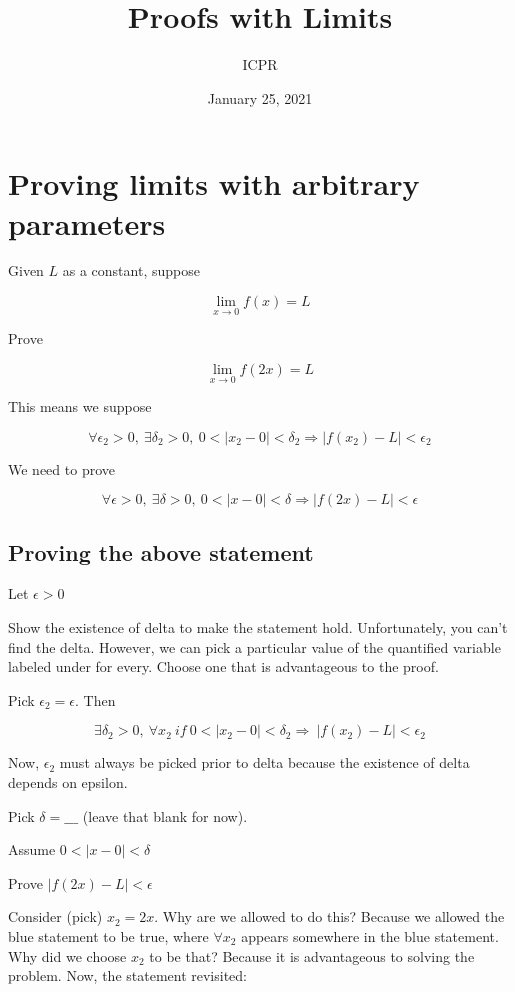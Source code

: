 \documentclass[
]{article}
\title{Proofs with Limits}
\author{ICPR}
\date{January 25, 2021}
\begin{document}
\maketitle


\section{Proving limits with arbitrary
parameters}

Given $L$ as a constant, suppose

$$\lim_{x \rightarrow 0}{f(x)} = L$$

Prove

$$\lim_{x \rightarrow 0}{f(2x)} = L$$

This means we suppose

$$\forall\epsilon_{2} > 0,\ \exists\delta_{2} > 0,\ 0 < \left| x_{2} - 0 \right| < \delta_{2} \Rightarrow \left| f\left( x_{2} \right) - L \right| < \epsilon_{2}$$

We need to prove

$$\forall\epsilon > 0,\ \exists\delta > 0,\ 0 < |x - 0| < \delta \Rightarrow \left| f(2x) - L \right| < \epsilon$$


\subsection{Proving the above
statement}

Let $\epsilon > 0$

Show the existence of delta to make the statement hold. Unfortunately,
you can't find the delta. However, we can pick a particular value of the
quantified variable labeled under for every. Choose one that is
advantageous to the proof.

Pick $\epsilon_{2} = \epsilon$. Then

$$\exists\delta_{2} > 0,\ \forall x_{2}\ if\ 0 < \left| x_{2} - 0 \right| < \delta_{2} \Rightarrow \ \left| f\left( x_{2} \right) - L \right| < \epsilon_{2}$$

Now, $\epsilon_{2}$ must always be picked prior to delta because the
existence of delta depends on epsilon.

Pick $\delta = \_\_\_$ (leave that blank for now).

Assume $0 < |x - 0| < \delta$

Prove $\left| f(2x) - L \right| < \epsilon$

Consider (pick) $x_{2} = 2x$. Why are we allowed to do this? Because
we allowed the blue statement to be true, where $\forall x_{2}$
appears somewhere in the blue statement. Why did we choose $x_{2}$ to
be that? Because it is advantageous to solving the problem. Now, the
statement revisited:
\end{document}
